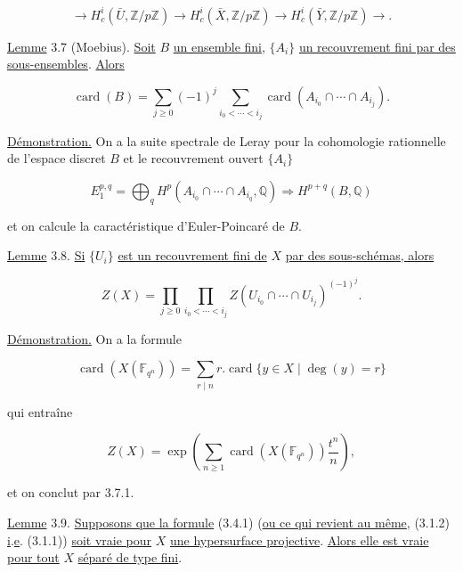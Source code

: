 \begin{equation}\tag{3.6.2}
\longrightarrow H_c^i(\bar U,\mathbb Z/p\mathbb Z)
\longrightarrow H_c^i(\bar X,\mathbb Z/p\mathbb Z)
\longrightarrow H_c^i(\bar Y,\mathbb Z/p\mathbb Z)\longrightarrow.
\end{equation}


\underline{Lemme} 3.7 (Moebius). \underline{Soit} $B$ \underline{un ensemble fini},
$\{A_i\}$ \underline{un recouvrement fini par des sous-ensembles}. \underline{Alors}

\begin{equation}\tag{3.7.1}
\operatorname{card}(B)=
\sum_{j\geq0}(-1)^j
\sum_{i_0<\cdots<i_j}
\operatorname{card}(A_{i_0}\cap\cdots\cap A_{i_j}).
\end{equation}

\underline{Démonstration.} On a la suite spectrale de Leray pour la
cohomologie rationnelle de l'espace discret $B$ et le recouvrement ouvert
$\{A_i\}$

\[
E_1^{p,q}=\bigoplus_q
H^p(A_{i_0}\cap\cdots\cap A_{i_q},\mathbb Q)
\Longrightarrow H^{p+q}(B,\mathbb Q)
\]

et on calcule la caractéristique d'Euler-Poincaré de $B$.

\underline{Lemme} 3.8. \underline{Si} $\{U_i\}$ \underline{est un recouvrement fini de}
$X$ \underline{par des sous-schémas, alors}

\begin{equation}\tag{3.8.1}
Z(X)=
\prod_{j\geq0}
\prod_{i_0<\cdots<i_j}
Z(U_{i_0}\cap\cdots\cap U_{i_j})^{(-1)^j}.
\end{equation}

\underline{Démonstration.} On a la formule

\begin{equation}\tag{3.8.2}
\operatorname{card}(X(\mathbb F_{q^n}))
=\sum_{r\mid n}r.\operatorname{card}\{y\in X\mid\deg(y)=r\}
\end{equation}

qui entraîne

\begin{equation}\tag{3.8.3}
Z(X)=\exp\!\left(
\sum_{n\geq1}\operatorname{card}(X(\mathbb F_{q^n}))\frac{t^n}{n}
\right),
\end{equation}

et on conclut par 3.7.1.

\underline{Lemme} 3.9. \underline{Supposons que la formule} (3.4.1) (\underline{ou ce qui
revient au même}, (3.1.2) \underline{i}.\underline{e}. (3.1.1)) \underline{soit vraie pour} $X$ \underline{une hypersurface
projective}. \underline{Alors elle est vraie pour tout} $X$ \underline{séparé de type fini}.

